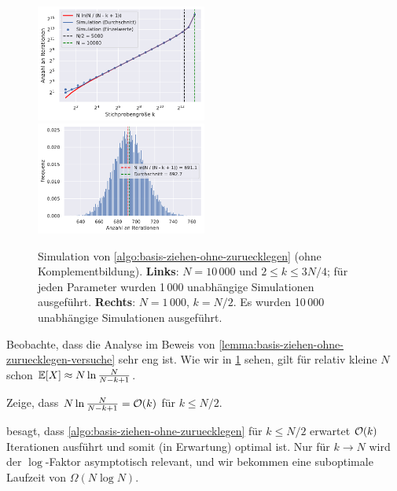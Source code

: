 \noindent
\begin{figure}
    \begin{center}
        \includegraphics[width=0.5\textwidth]{data/gnm_iterationen.pdf}%
        \includegraphics[width=0.5\textwidth]{data/gnm_iterationen_hist.pdf}
    \end{center}
    \caption{Simulation von \cref{algo:basis-ziehen-ohne-zuruecklegen} (ohne Komplementbildung).
        \textbf{Links}: $N=10\,000$ und $2 \le k \le 3N/4$; für jeden Parameter wurden 1\,000 unabhängige Simulationen ausgeführt.
        \textbf{Rechts}: $N=1\,000$, $k = N/2$. Es wurden 10\,000 unabhängige Simulationen ausgeführt.
    }
    \label{fig:ziehen-ohne-zuruecklegen-iterationen}
\end{figure}

Beobachte, dass die Analyse im Beweis von \cref{lemma:basis-ziehen-ohne-zuruecklegen-versuche} sehr eng ist.
Wie wir in \cref{fig:ziehen-ohne-zuruecklegen-iterationen} sehen, gilt für relativ kleine $N$ schon $\mathbb{E}\!\left[X\right] \approx N \ln \frac{N}{N - k + 1}$.

\begin{exercise}
    Zeige, dass $N \ln \frac{N}{N - k + 1} = \mathcal{O}\!\left(k\right)$ für $k \le N / 2$.
\end{exercise}

\bigskip

 besagt, dass \cref{algo:basis-ziehen-ohne-zuruecklegen} für $k \le N / 2$ erwartet $\mathcal{O}\!\left(k\right)$ Iterationen ausführt und somit (in Erwartung) optimal ist.
Nur für $k \to N$ wird der $\log$-Faktor asymptotisch relevant, und wir bekommen eine suboptimale Laufzeit von $\Omega(N \log N)$.

